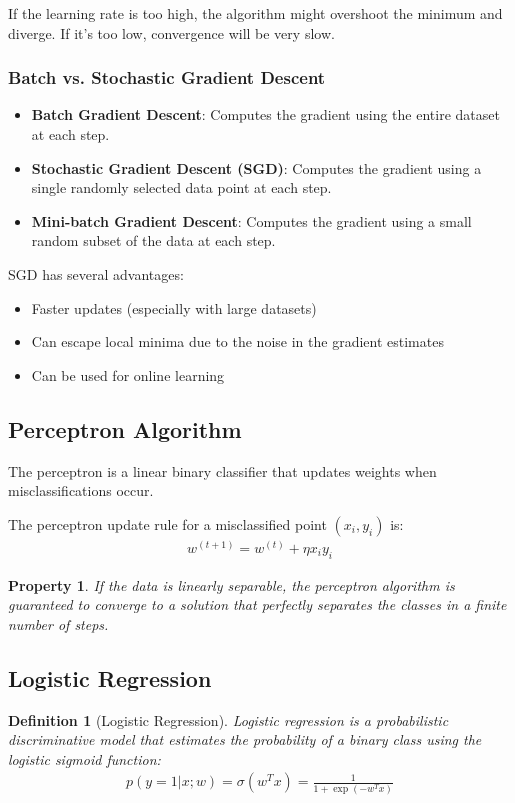 \documentclass{article}
\newtheorem{definition}{Definition}
\newtheorem{property}{Property}
\begin{document}
If the learning rate is too high, the algorithm might overshoot the minimum and diverge. If it's too low, convergence will be very slow.

\subsubsection{Batch vs. Stochastic Gradient Descent}
\begin{itemize}
\item \textbf{Batch Gradient Descent}: Computes the gradient using the entire dataset at each step.
\item \textbf{Stochastic Gradient Descent (SGD)}: Computes the gradient using a single randomly selected data point at each step.
\item \textbf{Mini-batch Gradient Descent}: Computes the gradient using a small random subset of the data at each step.
\end{itemize}

SGD has several advantages:
\begin{itemize}
\item Faster updates (especially with large datasets)
\item Can escape local minima due to the noise in the gradient estimates
\item Can be used for online learning
\end{itemize}

\subsection{Perceptron Algorithm}
The perceptron is a linear binary classifier that updates weights when misclassifications occur.

The perceptron update rule for a misclassified point $(x_i, y_i)$ is:
\begin{align}
w^{(t+1)} = w^{(t)} + \eta x_i y_i
\end{align}

\begin{property}
If the data is linearly separable, the perceptron algorithm is guaranteed to converge to a solution that perfectly separates the classes in a finite number of steps.
\end{property}

\subsection{Logistic Regression}
\begin{definition}[Logistic Regression]
Logistic regression is a probabilistic discriminative model that estimates the probability of a binary class using the logistic sigmoid function:
\begin{align}
p(y=1|x;w) = \sigma(w^Tx) = \frac{1}{1+\exp(-w^Tx)}
\end{align}
\end{definition}
\end{document}
